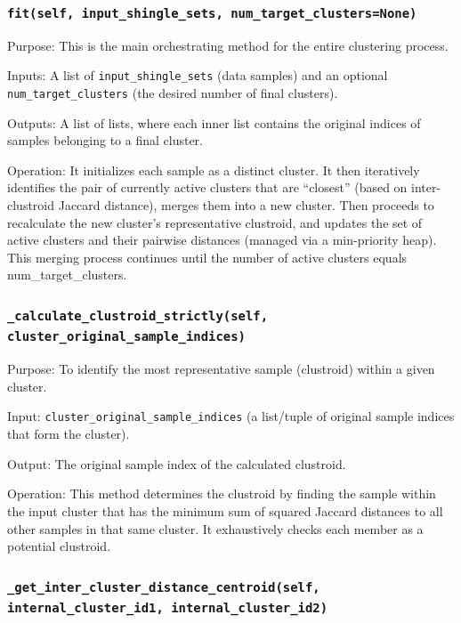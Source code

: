 \subsubsection{\texttt{fit(self, input\_shingle\_sets, num\_target\_clusters=None)}}\text{}

Purpose: This is the main orchestrating method for the entire clustering process.

Inputs: A list of \texttt{input\_shingle\_sets} (data samples) and an optional \texttt{num\_target\_clusters} (the desired number of final clusters).

Outputs: A list of lists, where each inner
list contains the original indices of samples belonging to a final cluster.

Operation: It initializes each sample as a distinct cluster.
It then iteratively identifies the pair of currently active clusters that are ``closest'' (based on inter-clustroid Jaccard distance), merges them into a new cluster.
Then proceeds to recalculate the new cluster's representative clustroid, and updates the set of active clusters and their pairwise distances (managed via a min-priority heap).
This merging process continues until the number of active clusters equals num\_target\_clusters.

\subsubsection{\texttt{\_calculate\_clustroid\_strictly(self, cluster\_original\_sample\_indices)}}\text{}

Purpose: To identify the most representative sample (clustroid) within a given cluster.

Input: \texttt{cluster\_original\_sample\_indices} (a list/tuple of original sample indices that form the cluster).

Output: The original sample index of the calculated clustroid.

Operation: This method determines the clustroid by finding the sample within the input cluster that has the minimum sum of squared Jaccard distances to all other samples in that same cluster.
It exhaustively checks each member as a potential clustroid.

\subsubsection{\texttt{\_get\_inter\_cluster\_distance\_centroid(\-self, internal\_cluster\_id1, internal\_cluster\_id2)}}\text{}

